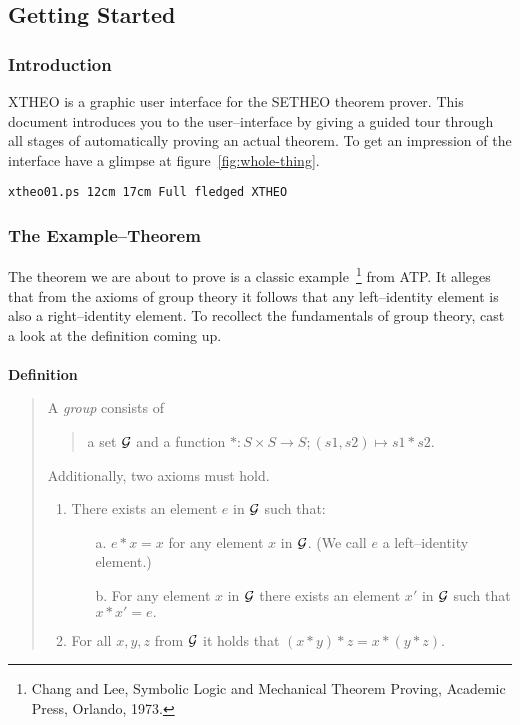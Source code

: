 \newcommand\bild[5]{{\tt #1 #2 #3 #4 }\label{#5}}

\subsection{Getting Started}
\subsubsection{Introduction} 
XTHEO is a graphic user interface for the SETHEO theorem prover.
This document introduces you to the user--interface by giving a 
guided tour through all stages of automatically proving an actual theorem.
To get an impression of the interface have a glimpse at figure~\ref{fig:whole-thing}.

\bild{xtheo01.ps}{12cm}{17cm}{Full fledged XTHEO}{fig:whole-thing}

\subsubsection{The Example--Theorem} 
The theorem we are about to prove is a classic example~\footnote{Chang and Lee, 
Symbolic Logic and Mechanical Theorem Proving, Academic Press, Orlando, 1973.} from ATP.
It alleges that from the axioms of group theory it follows that any
left--identity element is also a right--identity element. 
To recollect the fundamentals of group theory, cast a look at the definition coming up.
\\ \\
{\bf Definition}
\begin{quote}
A {\it group\/} consists of 
\begin{quote}
a set $\cal G$ 
and 
a function $* : S \times S \rightarrow S; (s1,s2) \mapsto s1 * s2$. 
\end{quote}
Additionally, two axioms must hold.
\begin{enumerate}
\item There exists an element $e$ in $\cal G$ such that: \\
\begin{itemize}
\item[a.]$e * x = x$ for any element $x$ in $\cal G$. 
(We call $e$ a left--identity element.) 
\item[b.] For any element $x$ in $\cal G$ there exists an element $x'$ in $\cal G$ such that 
$x * x' = e.$ \\ 
\end{itemize}
\item For all $x, y, z$ from $\cal G$ it holds that $(x * y) * z = x * (y * z)$.
\end{enumerate}
\end{quote}


